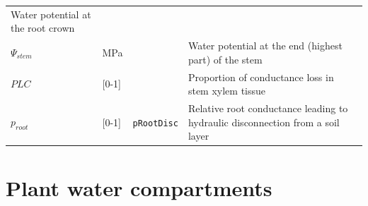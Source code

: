\documentclass[]{book}
\begin{document}
\begin{longtable}[]{@{}llll@{}}
\begin{minipage}[t]{0.45\columnwidth}
Water potential at the root crown\strut
\end{minipage}\tabularnewline
\begin{minipage}[t]{0.11\columnwidth}\raggedright\strut
\(\Psi_{stem}\)\strut
\end{minipage} & \begin{minipage}[t]{0.10\columnwidth}\raggedright\strut
MPa\strut
\end{minipage} & \begin{minipage}[t]{0.12\columnwidth}\raggedright\strut
\strut
\end{minipage} & \begin{minipage}[t]{0.45\columnwidth}\raggedright\strut
Water potential at the end (highest part) of the stem\strut
\end{minipage}\tabularnewline
\begin{minipage}[t]{0.11\columnwidth}\raggedright\strut
\(PLC\)\strut
\end{minipage} & \begin{minipage}[t]{0.10\columnwidth}\raggedright\strut
{[}0-1{]}\strut
\end{minipage} & \begin{minipage}[t]{0.12\columnwidth}\raggedright\strut
\strut
\end{minipage} & \begin{minipage}[t]{0.45\columnwidth}\raggedright\strut
Proportion of conductance loss in stem xylem tissue\strut
\end{minipage}\tabularnewline
\begin{minipage}[t]{0.11\columnwidth}\raggedright\strut
\(p_{root}\)\strut
\end{minipage} & \begin{minipage}[t]{0.10\columnwidth}\raggedright\strut
{[}0-1{]}\strut
\end{minipage} & \begin{minipage}[t]{0.12\columnwidth}\raggedright\strut
\texttt{pRootDisc}\strut
\end{minipage} & \begin{minipage}[t]{0.45\columnwidth}\raggedright\strut
Relative root conductance leading to hydraulic disconnection from a soil
layer\strut
\end{minipage}\tabularnewline
\bottomrule
\end{longtable}

\section{Plant water compartments}\label{plant-water-compartments}
\end{document}
